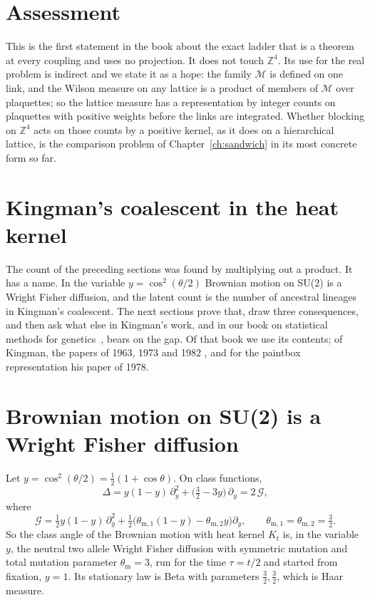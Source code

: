 \section{Assessment}

This is the first statement in the book about the exact ladder that is a theorem at every coupling and uses no projection. It does not touch $\mathbb Z^4$. Its use for the real problem is indirect and we state it as a hope: the family $\mathcal M$ is defined on one link, and the Wilson measure on any lattice is a product of members of $\mathcal M$ over plaquettes; so the lattice measure has a representation by integer counts on plaquettes with positive weights before the links are integrated. Whether blocking on $\mathbb Z^4$ acts on those counts by a positive kernel, as it does on a hierarchical lattice, is the comparison problem of Chapter~\ref{ch:sandwich} in its most concrete form so far.

\section{Kingman's coalescent in the heat kernel}\label{ch:kingman}

The count of the preceding sections was found by multiplying out a product. It has a name. In the variable $y=\cos^2(\theta/2)$ Brownian motion on SU(2) is a Wright Fisher diffusion, and the latent count is the number of ancestral lineages in Kingman's coalescent. The next sections prove that, draw three consequences, and then ask what else in Kingman's work, and in our book on statistical methods for genetics~\cite{Po26g}, bears on the gap. Of that book we use its contents; of Kingman, the papers of 1963, 1973 and 1982 \cite{Ki63,Ki73,Ki82}, and for the paintbox representation his paper of 1978.

\section{Brownian motion on SU(2) is a Wright Fisher diffusion}\label{sec:wf}

\begin{proposition}\label{prop:wf}
Let $y=\cos^2(\theta/2)=\frac12(1+\cos\theta)$. On class functions,
\[
\Delta=y(1-y)\,\partial_y^2+\big(\tfrac32-3y\big)\,\partial_y=2\,\mathcal G,
\]
where
\[
\mathcal G=\tfrac12y(1-y)\,\partial_y^2+\tfrac12\big(\theta_{\mathrm m,1}(1-y)-\theta_{\mathrm m,2}y\big)\partial_y,\qquad\theta_{\mathrm m,1}=\theta_{\mathrm m,2}=\tfrac32 .
\]
So the class angle of the Brownian motion with heat kernel $K_t$ is, in the variable $y$, the neutral two allele Wright Fisher diffusion with symmetric mutation and total mutation parameter $\theta_{\mathrm m}=3$, run for the time $\tau=t/2$ and started from fixation, $y=1$. Its stationary law is Beta with parameters $\frac32,\frac32$, which is Haar measure.
\end{proposition}

